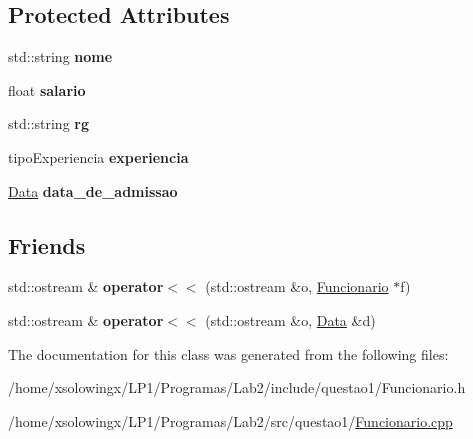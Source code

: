 \subsection*{Protected Attributes}
\begin{DoxyCompactItemize}
\item 
\mbox{\label{classFuncionario_ac9e214af6fa91e21aa376a81e28f17ae}} 
std\+::string {\bfseries nome}
\item 
\mbox{\label{classFuncionario_a6d2fb0ac067adb3de9e227bf7bce4df2}} 
float {\bfseries salario}
\item 
\mbox{\label{classFuncionario_a8bb0fc88b355336afc9e26a5be794f36}} 
std\+::string {\bfseries rg}
\item 
\mbox{\label{classFuncionario_aa38391a6625332bc6a1216af5fb2dc2b}} 
tipo\+Experiencia {\bfseries experiencia}
\item 
\mbox{\label{classFuncionario_acc74a2d435a81e54f00a44a78e5cb201}} 
\hyperlink{classData}{Data} {\bfseries data\+\_\+de\+\_\+admissao}
\end{DoxyCompactItemize}
\subsection*{Friends}
\begin{DoxyCompactItemize}
\item 
\mbox{\label{classFuncionario_a786081bcbad79eb3c4638501d55739aa}} 
std\+::ostream \& {\bfseries operator$<$$<$} (std\+::ostream \&o, \hyperlink{classFuncionario}{Funcionario} $\ast$f)
\item 
\mbox{\label{classFuncionario_ac644911b5b8d7f222388aa69dd6b6f6f}} 
std\+::ostream \& {\bfseries operator$<$$<$} (std\+::ostream \&o, \hyperlink{classData}{Data} \&d)
\end{DoxyCompactItemize}


The documentation for this class was generated from the following files\+:\begin{DoxyCompactItemize}
\item 
/home/xsolowingx/\+L\+P1/\+Programas/\+Lab2/include/questao1/Funcionario.\+h\item 
/home/xsolowingx/\+L\+P1/\+Programas/\+Lab2/src/questao1/\hyperlink{Funcionario_8cpp}{Funcionario.\+cpp}\end{DoxyCompactItemize}
